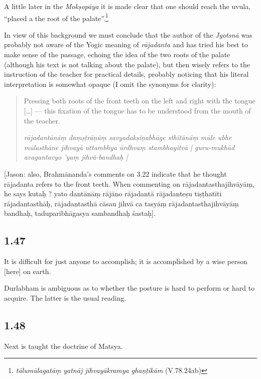\begin{ekdosis}
\begin{philcomm}[hp01_045]
A little later in the \emph{Mokṣopāya} it is made clear that one should reach the uvula, ``placed a
the root of the palate''.\footnote{\emph{tālumūlagatāṃ yatnāj jihvayākramya ghaṇṭikām}
  (V.78.24ab)}

In view of this background we must conclude that the author of the \emph{Jyotsnā} was probably not
aware of the Yogic meaning of \emph{rājadanta} and has tried his best to make sense of the passage,
echoing the idea of the two roots of the palate (although his text is not talking about the
palate), but then wisely refers to the instruction of the teacher for practical details, probably
noticing that his literal interpretation is somewhat opaque (I omit the synonyms for clarity):

\begin{quote}
Pressing both roots of the front teeth on the left and right with the tongue [\ldots] — this fixation of the tongue has to be understood from the mouth of the teacher. 
  
\emph{rājadantānāṃ daṃṣṭrāṇāṃ savyadakṣiṇabhāge sthitānāṃ mūle ubhe mūlasthāne jihvayā uttambhya ūrdhvaṃ stambhayitvā | guru-mukhād avagantavyo 'yaṃ jihvā-bandhaḥ |}
\end{quote}

[Jason: also, Brahmānanda’s comments on 3.22 indicate that he thought rājadanta refers to the front teeth. When commenting on rājadantasthajihvāyāṃ, he says kutaḥ ? yato dantānāṃ rājāno rājadantā rājadanteṣu tiṣṭhatīti rājadantasthāḥ, rājadantasthā cāsau jihvā ca tasyāṃ rājadantasthajihvāyāṃ bandhaḥ, taduparibhāgasya sambandhaḥ śastaḥ].
\end{philcomm}

\subsection*{1.47}
\begin{translation}[hp01_047]
It is difficult for just anyone to accomplish; it is accomplished by a wise person [here] on earth.
\end{translation}

\begin{philcomm}[hp01_047]
Durlabham is ambiguous as to whether the posture is hard to perform or hard to acquire. The latter is the usual reading.
\end{philcomm}

\subsection*{1.48}
\begin{translation}[hp01_048]
Next is taught the doctrine of Matsya.


\end{translation}
\end{ekdosis}
